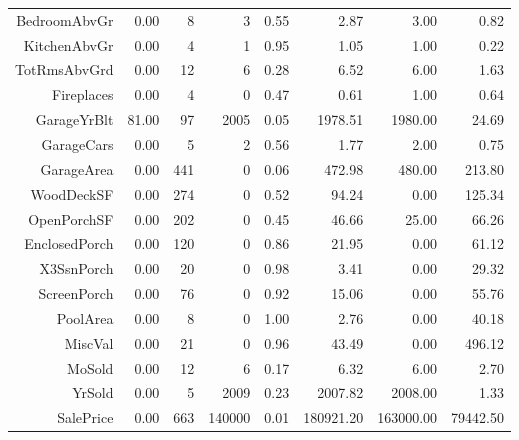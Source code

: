 \begin{table}[ht]
\begin{tabular}{rrrrrrrr}
  BedroomAbvGr & 0.00 &   8 &   3 & 0.55 & 2.87 & 3.00 & 0.82 \\ 
  KitchenAbvGr & 0.00 &   4 &   1 & 0.95 & 1.05 & 1.00 & 0.22 \\ 
  TotRmsAbvGrd & 0.00 &  12 &   6 & 0.28 & 6.52 & 6.00 & 1.63 \\ 
  Fireplaces & 0.00 &   4 &   0 & 0.47 & 0.61 & 1.00 & 0.64 \\ 
  GarageYrBlt & 81.00 &  97 & 2005 & 0.05 & 1978.51 & 1980.00 & 24.69 \\ 
  GarageCars & 0.00 &   5 &   2 & 0.56 & 1.77 & 2.00 & 0.75 \\ 
  GarageArea & 0.00 & 441 &   0 & 0.06 & 472.98 & 480.00 & 213.80 \\ 
  WoodDeckSF & 0.00 & 274 &   0 & 0.52 & 94.24 & 0.00 & 125.34 \\ 
  OpenPorchSF & 0.00 & 202 &   0 & 0.45 & 46.66 & 25.00 & 66.26 \\ 
  EnclosedPorch & 0.00 & 120 &   0 & 0.86 & 21.95 & 0.00 & 61.12 \\ 
  X3SsnPorch & 0.00 &  20 &   0 & 0.98 & 3.41 & 0.00 & 29.32 \\ 
  ScreenPorch & 0.00 &  76 &   0 & 0.92 & 15.06 & 0.00 & 55.76 \\ 
  PoolArea & 0.00 &   8 &   0 & 1.00 & 2.76 & 0.00 & 40.18 \\ 
  MiscVal & 0.00 &  21 &   0 & 0.96 & 43.49 & 0.00 & 496.12 \\ 
  MoSold & 0.00 &  12 &   6 & 0.17 & 6.32 & 6.00 & 2.70 \\ 
  YrSold & 0.00 &   5 & 2009 & 0.23 & 2007.82 & 2008.00 & 1.33 \\ 
  SalePrice & 0.00 & 663 & 140000 & 0.01 & 180921.20 & 163000.00 & 79442.50 \\ 
   \hline
\end{tabular}
\end{table}
